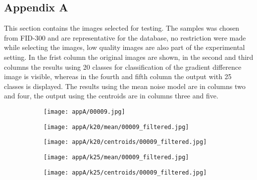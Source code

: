 \documentclass[draft,final]{vutinfth} %
\begin{document}
\begin{appendices}
		\chapter{Appendix A}
		\label{AppA}
		This section contains the images selected for testing.
		The samples was chosen from FID-300 and are representative for the database, no restriction were made while selecting the images, low quality images are also part of the experimental setting.
		In the frist column the original images are shown, in the second and third columns the results using 20 classes for classification of the gradient difference image is visible, whereas in the fourth and fifth column the output with 25 classes is displayed.
		The results using the mean noise model are in columns two and four, the output using the centroids are in columns three and five.
\begin{figure}[h]
\centering
  \begin{subfigure}[t]{0.19\columnwidth}
    \centering
    \texttt{[image: appA/00009.jpg]}
  \end{subfigure}
  \begin{subfigure}[t]{0.19\columnwidth}
    \centering
    \texttt{[image: appA/k20/mean/00009\_filtered.jpg]}
  \end{subfigure}
  \begin{subfigure}[t]{0.19\columnwidth}
    \centering
    \texttt{[image: appA/k20/centroids/00009\_filtered.jpg]}
  \end{subfigure}
  \begin{subfigure}[t]{0.19\columnwidth}
    \centering
    \texttt{[image: appA/k25/mean/00009\_filtered.jpg]}
  \end{subfigure}
  \begin{subfigure}[t]{0.19\columnwidth}
    \centering
    \texttt{[image: appA/k25/centroids/00009\_filtered.jpg]}
  \end{subfigure}
\caption{}
\end{figure}  


\end{appendices}
\end{document}
